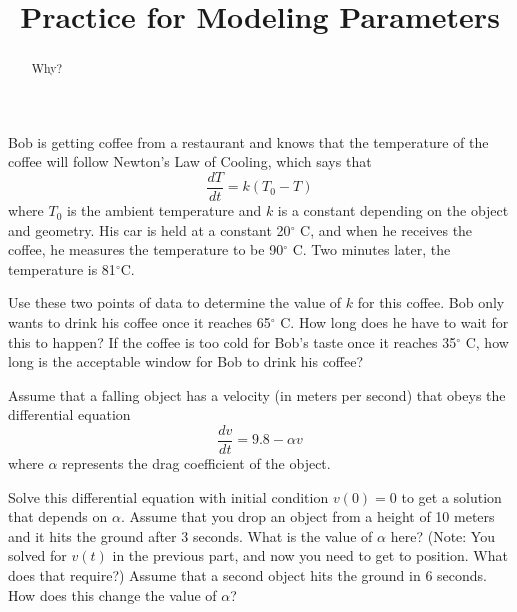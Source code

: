 \documentclass{ximera}
\title{Practice for Modeling Parameters}
\begin{document}
\begin{abstract}
    Why?
\end{abstract}
\maketitle


\begin{exercise}
    Bob is getting coffee from a restaurant and knows that the temperature of the coffee will follow Newton's Law of Cooling, which says that
    \begin{equation*}
        \frac{dT}{dt} = k(T_0 - T)
    \end{equation*}
    where $T_0$ is the ambient temperature and $k$ is a constant depending on the object and geometry. His car is held at a constant 20$^\circ$ C, and when he receives the coffee, he measures the temperature to be 90$^\circ$ C. Two minutes later, the temperature is 81$^\circ$C.
    \begin{tasks}
        \task Use these two points of data to determine the value of $k$ for this coffee.
        \task Bob only wants to drink his coffee once it reaches 65$^\circ$ C. How long does he have to wait for this to happen? 
        \task If the coffee is too cold for Bob's taste once it reaches 35$^\circ$ C, how long is the acceptable window for Bob to drink his coffee?
    \end{tasks} 
\end{exercise}

\begin{exercise}
    Assume that a falling object has a velocity (in meters per second) that obeys the differential equation
    \begin{equation*}
        \frac{dv}{dt} = 9.8 - \alpha v
    \end{equation*}
    where $\alpha$ represents the drag coefficient of the object.
    \begin{tasks}
        \task Solve this differential equation with initial condition $v(0) = 0$ to get a solution that depends on $\alpha$. 
        \task Assume that you drop an object from a height of 10 meters and it hits the ground after $3$ seconds. What is the value of $\alpha$ here? (Note: You solved for $v(t)$ in the previous part, and now you need to get to position. What does that require?)
        \task Assume that a second object hits the ground in 6 seconds. How does this change the value of $\alpha$?
    \end{tasks}
\end{exercise}
\end{document}
